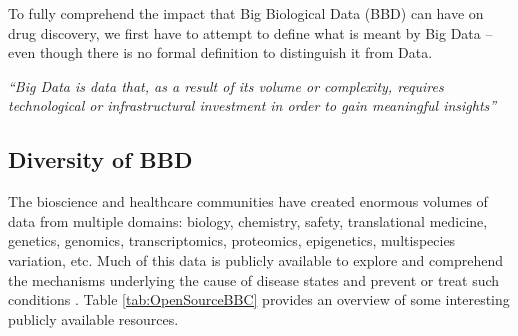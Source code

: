 To fully comprehend the impact that Big Biological Data (BBD) can have on drug discovery, we first have to attempt to define what is meant by Big Data -- even though there is no formal definition to distinguish it from Data.

\begin{center}
\emph{``Big Data is data that, as a result of its volume or complexity, requires technological or infrastructural investment in order to gain meaningful insights''}
\end{center}

\subsection{Diversity of BBD}

The bioscience and healthcare communities have created enormous volumes of data from multiple domains: biology, chemistry, safety, translational medicine, genetics, genomics, transcriptomics, proteomics, epigenetics, multispecies variation, etc. Much of this data is publicly available to explore and comprehend the mechanisms underlying the cause of disease states and prevent or treat such conditions \cite{brown2018}. Table \ref{tab:OpenSourceBBC} provides an overview of some interesting publicly available resources.

